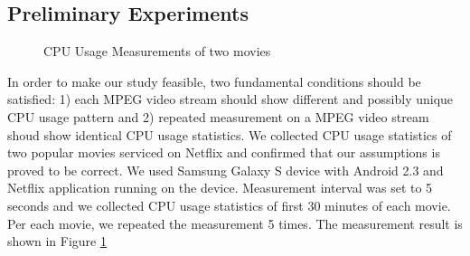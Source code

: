 \subsection{Preliminary Experiments}

\begin{figure}[!ht]
	\centering
	\caption{CPU Usage Measurements of two movies}
	\label{fig:preliminaries}
\end{figure}

In order to make our study feasible, two fundamental conditions should be satisfied: 1) each MPEG video stream should show different and possibly unique CPU usage pattern and 2) repeated measurement on a MPEG video stream shoud show identical CPU usage statistics. 
We collected CPU usage statistics of two popular movies serviced on Netflix and confirmed that our assumptions is proved to be correct.
We used Samsung Galaxy S device with Android 2.3 and Netflix application running on the device. 
Measurement interval was set to 5 seconds and we collected CPU usage statistics of first 30 minutes of each movie. 
Per each movie, we repeated the measurement 5 times. 
The measurement result is shown in Figure \ref{fig:preliminaries}

